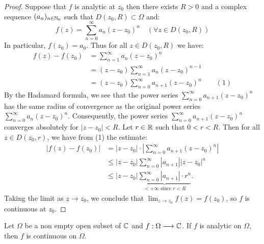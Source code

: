   \begin{proof}
  Suppose that $f $ is analytic at $z_0 $ then there exists $R > 0 $ and a complex sequence $(a_n ) _{n \in  \mathbb{N}_0} $ such
  that $D(z_0, R) \subset \Omega  $  and: 
  \[
  f(z) = 
  \sum_{n=0}^{\infty} a_n (z-z_0) ^n  \quad (\forall  z \in   D(z_0, R) ) 
  \]
  In particular, $f(z_0)  = a_0 $. Thus for all $z \in   D(z_0, R)  $ we have: 
  \begin{align*}
    f(z)  - f(z_0)  &= 
    \sum_{n=1}^{\infty} a_n (z-z_0) ^n  \\
                    &= 
                    (z-z_0) \sum_{n=1}^{\infty} a_n (z-z_0) ^{n-1} \\
                    &= (z-z_0)  
                    \sum_{n=0}^{\infty} a_{n+1} (z-z_0) ^n  \quad \quad  (1)
  \end{align*}
  By the Hadamard formula, we see that the power series 
  $\sum_{n=0}^{\infty} a_{n+1}(z-z_0) ^n  $ has the same 
  radius of convergence as the original power series $\sum_{n=0}^{\infty} a_n (z-z_0) ^n  $.
  Consequently, the power series $\sum_{n=0}^{\infty} a_{n+1}(z-z_0) ^n  $  converges
  absolutely for $\left| z-z_0 \right|  < R $. Let $r \in  \mathbb{R}  $ such that 
  $0 <  r <  R$. Then for all $z \in  D(z_0, r)  $, we have  from (1) the estimate: 
  \begin{align*}
    \left| f(z) - f(z_0)  \right|  &= 
    \left| z-z_0 \right|   
    \cdot 
    \left| \sum_{n=0}^{\infty} a_{n+1}(z-z_0) ^n  \right|  
                                \\ & \leq 
                                \left| z-z_0 \right|  \sum_{n=0}^{\infty} \left| a_{n+1} \right|  
                                \left| z-z_0 \right|  ^n \\
                                   & \leq 
                                   \left| z-z_0 \right|  
                                   \underbrace{
                                   \sum_{n=0}^{\infty} \left| a_{n+1} \right|  \cdot 
                                   r^{n}
                                   }_{< +\infty  \text{ since }  r <  R } .
  \end{align*}
  Taking the limit as $z \rightarrow z_0 $, we conclude that $\lim_{z \to z_0} f(z) = f(z_0)  $, so $f $ is continuous at 
  $z_0$. 
  \end{proof}
  \begin{corollary}[Immediate]
    Let $\Omega  $ be a non empty open subset of $\mathbb{C}  $ and $ f : \Omega  \longrightarrow \mathbb{C}  $. If 
    $f $ is analytic on $\Omega  $, then $f $ is continuous on $\Omega$. 
  \end{corollary}
